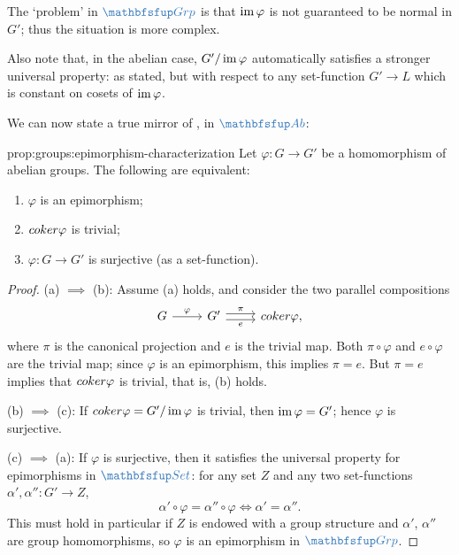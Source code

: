 The `problem' in $\categ{Grp}$ is that $\operatorname{im}\varphi$ is not
guaranteed to be normal in $G'$; thus the situation is more complex.

Also note that, in the abelian case, $G'/\operatorname{im}\varphi$ automatically
satisfies a stronger universal property: as stated, but with respect
to any set-function $G' \to L$ which is constant on cosets of
$\operatorname{im}\varphi$.

We can now state a true mirror of
, in
$\categ{Ab}$:

\begin{prop}{}{prop:groups:epimorphism-characterization}
  Let $\varphi : G \to G'$ be a homomorphism of abelian
groups. The following are equivalent:
\begin{enumerate}[label=(\alph*)]
  \item $\varphi$ is an epimorphism;
  \item $coker\varphi$ is trivial;
  \item $\varphi : G \to G'$ is surjective (as a
    set-function).
  \end{enumerate}
\end{prop}
\begin{proof}
  (a) $\implies$ (b): Assume (a) holds, and consider the two parallel
  compositions
  \[
    \begin{tikzcd}
      G \arrow[r, "\varphi"] & G' \arrow[r, shift left, "\pi"]
      \arrow[r, shift right, "e"'] & \coker\varphi,
    \end{tikzcd}
  \]
  where $\pi$ is the canonical projection and $e$ is the trivial map.
  Both $\pi \circ \varphi$ and $e \circ \varphi$ are the trivial map;
  since $\varphi$ is an epimorphism, this implies $\pi = e$. But
  $\pi = e$ implies that $coker\varphi$ is trivial, that is, (b)
  holds.

  (b) $\implies$ (c): If $coker\varphi = G'/\operatorname{im}\varphi$ is
  trivial, then $\operatorname{im}\varphi = G'$; hence $\varphi$ is surjective.

  (c) $\implies$ (a): If $\varphi$ is surjective, then it satisfies
  the universal property for epimorphisms in $\categ{Set}$: for any
  set $Z$ and any two set-functions $\alpha', \alpha'' : G' \to Z$,
  \[
    \alpha' \circ \varphi = \alpha'' \circ \varphi \iff \alpha' =
    \alpha''.
  \]
  This must hold in particular if $Z$ is endowed with a group
  structure and $\alpha'$, $\alpha''$ are group homomorphisms, so
  $\varphi$ is an epimorphism in $\categ{Grp}$.
\end{proof}

